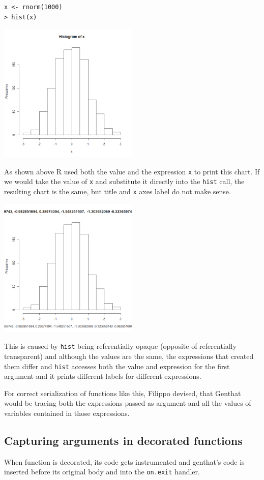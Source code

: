 \documentclass[thesis=B,english]{FITthesis}[2012/10/20]
\begin{document}
\begin{verbatim}
x <- rnorm(1000)
> hist(x)
\end{verbatim}

\includegraphics[width=0.5\textwidth]{img/hist.png}

As shown above R used both the value and the expression \verb|x| to print this chart. If we would take the value of \verb|x| and substitute it directly into the \verb|hist| call, the resulting chart is the same, but title and \verb|x| axes label do not make sense.

\includegraphics[width=0.5\textwidth]{img/hist2.png}

This is caused by \verb|hist| being referentially opaque (opposite of referentially transparent) and although the values are the same, the expressions that created them differ and \verb|hist| accesses both the value and expression for the first argument and it prints different labels for different expressions.

For correct serialization of functions like this, Filippo devised, that Genthat would be tracing both the expressions passed as argument and all the values of variables contained in those expressions.

\subsection{Capturing arguments in decorated functions}
When function is decorated, its code gets instrumented and genthat’s code is inserted before its original body and into the \verb|on.exit| handler.
\end{document}
